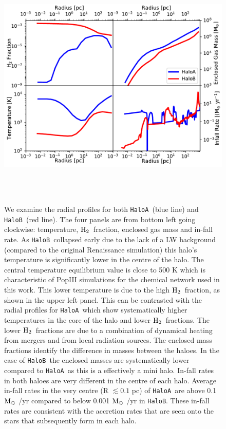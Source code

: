\documentclass[graphics, twocolumn, usenatbib]{mn2e}
\newcommand{\msolar} {$\rm{M_{\odot}}~$}
\newcommand{\molH} {$\rm{H_2}$~}
\newcommand{\ha} {\texttt{HaloA~}}
\newcommand{\hb} {\texttt{HaloB~}}
\newcommand{\hbc} {\texttt{HaloB}}
\begin{document}
\begin{figure}
\centering
\begin{minipage}{175mm}      \begin{center}
\centerline{
    \includegraphics[width=18.0cm, height=12cm]{FIGURES/MultiPlot.pdf}}
\caption{We examine the radial profiles for both \ha (blue line) and \hb (red line). The four panels
  are from bottom left going clockwise: temperature, \molH fraction, enclosed gas mass and in-fall rate.
  As \hb collapsed early due to the lack of a LW background (compared to the original Renaissance simulation)
  this halo's temperature is significantly lower in the centre of the halo. The central temperature equilibrium
  value is close to 500 K which is characteristic of PopIII simulations for the chemical network used in this work.
  This lower temperature is due to the high \molH fraction, as shown in the upper left panel. This can
  be contrasted with the radial profiles for \ha which show systematically higher temperatures in the core of the
  halo and lower \molH fractions. The lower \molH fractions are due to a combination of dynamical heating from
  mergers and from local radiation sources. The enclosed mass fractions identify the difference
  in masses between the haloes. In the case of \hb the enclosed masses are systematically lower compared
  to \ha as this is a effectively a mini halo. In-fall rates in both haloes are very different in the
  centre of each halo. Average in-fall rates in the very centre (R $\lesssim 0.1$ pc) of \ha are
  above 0.1 \msolar/yr compared to below 0.001 \msolar/yr in \hbc. These in-fall rates are consistent
  with the accretion rates that are seen onto the stars that subsequently form in each halo. }
\label{Fig:RadialProfiles}
\end{center} \end{minipage}
\end{figure}
\end{document}
